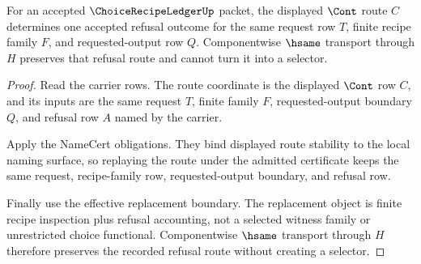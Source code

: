 \begin{theorem}
\label{thm:choice-recipe-ledger-refusal-route-determinacy}
For an accepted $\ChoiceRecipeLedgerUp$ packet, the displayed $\Cont$ route $C$ determines one accepted refusal outcome for the same request row $T$, finite recipe family $F$, and requested-output row $Q$. Componentwise $\hsame$ transport through $H$ preserves that refusal route and cannot turn it into a selector.
\end{theorem}
\begin{proof}
Read the carrier rows. The route coordinate is the displayed $\Cont$ row $C$, and its inputs are the same request $T$, finite family $F$, requested-output boundary $Q$, and refusal row $A$ named by the carrier.

Apply the NameCert obligations. They bind displayed route stability to the local naming surface, so replaying the route under the admitted certificate keeps the same request, recipe-family row, requested-output boundary, and refusal row.

Finally use the effective replacement boundary. The replacement object is finite recipe inspection plus refusal accounting, not a selected witness family or unrestricted choice functional. Componentwise $\hsame$ transport through $H$ therefore preserves the recorded refusal route without creating a selector.
\end{proof}

